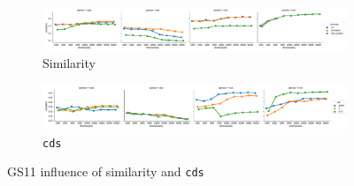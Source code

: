 \begin{figure}
  \centering

  \begin{subfigure}[t]{\textwidth}
    \includegraphics[width=1.1\textwidth]{supplement/figures/gs11-interaction-similarity}

  \caption{Similarity}
  \label{fig:gs11-similarity}
  \end{subfigure}

  \begin{subfigure}[t]{\textwidth}
    \includegraphics[width=1.1\textwidth]{supplement/figures/gs11-interaction-cds}

  \caption{\texttt{cds}}
  \label{fig:gs11-cds}
  \end{subfigure}

  \caption{GS11 influence of similarity and \texttt{cds}}
\end{figure}
